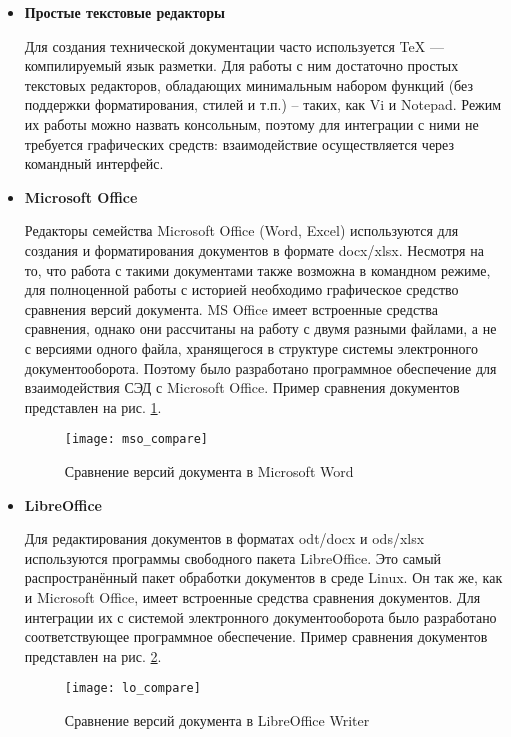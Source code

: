 \begin{itemize}[label=\textbf{---} ]
	
	\item \textbf{Простые текстовые редакторы}

	Для создания технической документации часто используется TeX --- компилируемый язык разметки. Для работы с ним достаточно простых текстовых редакторов, обладающих минимальным набором функций (без поддержки форматирования, стилей и т.п.) -- таких, как Vi и Notepad. Режим их работы можно назвать консольным, поэтому для интеграции с ними не требуется графических средств: взаимодействие осуществляется через командный интерфейс.
	
	\item \textbf{Microsoft Office}

	Редакторы семейства Microsoft Office (Word, Excel) используются для создания и форматирования документов в формате docx/xlsx. Несмотря на то, что работа с такими документами также возможна в командном режиме, для полноценной работы с историей необходимо графическое средство сравнения версий документа. MS Office имеет встроенные средства сравнения, однако они рассчитаны на работу с двумя разными файлами, а не с версиями одного файла, хранящегося в структуре системы электронного документооборота. Поэтому было разработано программное обеспечение для взаимодействия СЭД с Microsoft Office. Пример сравнения документов представлен на рис. \ref{img:mso_compare}.
	\begin{figure}[h!]
		\centering
		\texttt{[image: mso\_compare]}
		\caption{Сравнение версий документа в Microsoft Word}
		\label{img:mso_compare}
	\end{figure}

	\item \textbf{LibreOffice}

	Для редактирования документов в форматах odt/docx и ods/xlsx используются программы свободного пакета LibreOffice. Это самый распространённый пакет обработки документов в среде Linux. Он так же, как и Microsoft Office, имеет встроенные средства сравнения документов. Для интеграции их с системой электронного документооборота было разработано соответствующее программное обеспечение. Пример сравнения документов представлен на рис. \ref{img:lo_compare}.
	\begin{figure}[h!]
		\centering
		\texttt{[image: lo\_compare]}
		\caption{Сравнение версий документа в LibreOffice Writer}
		\label{img:lo_compare}
	\end{figure}
\end{itemize}
\FloatBarrier

